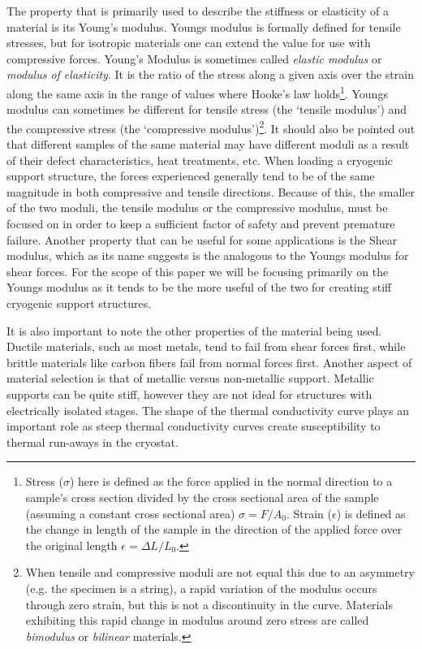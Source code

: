 \documentclass[final]{svjour2}
\begin{document}
The property that is primarily used to describe the stiffness or elasticity of a material is its Young's modulus. Youngs modulus is formally defined for tensile stresses, but for isotropic materials one can extend the value for use with compressive forces. Young's Modulus is sometimes called {\em elastic modulus} or {\em modulus of elasticity}. It is the ratio of the stress along a given axis over the strain along the same axis in the range of values where Hooke's law holds\footnote{Stress ($\sigma$) here is defined as the force applied in the normal direction to a sample's cross section divided by the cross sectional area of the sample (assuming a constant cross sectional area) $\sigma = F/A_{0}$.  Strain ($\epsilon$) is defined as the change in length of the sample in the direction of the applied force over the original length $\epsilon=\Delta L/L_{0}$.}.  Youngs modulus can sometimes be different for tensile stress (the `tensile modulus') and the compressive stress (the `compressive modulus')\footnote{When tensile and compressive moduli are not equal this due to an asymmetry (e.g. the specimen is a string), a rapid variation of the modulus occurs through zero strain, but this is not a discontinuity in the curve. Materials exhibiting this rapid change in modulus around zero stress are called {\em bimodulus} or {\em bilinear} materials.}. It should also be pointed out that different samples of the same material may have different moduli as a result of their defect characteristics, heat treatments, etc. When loading a cryogenic support structure, the forces experienced generally tend to be of the same magnitude in both compressive and tensile directions.  Because of this, the smaller of the two moduli, the tensile modulus or the compressive modulus, must be focused on in order to keep a sufficient factor of safety and prevent premature failure. Another property that can be useful for some applications is the Shear modulus, which as its name suggests is the analogous to the Youngs modulus for shear forces.  For the scope of this paper we will be focusing primarily on the Youngs modulus as it tends to be the more useful of the two for creating stiff cryogenic support structures. 

It is also important to note the other properties of the material being used.  Ductile materials, such as most metals, tend to fail from shear forces first, while brittle materials like carbon fibers fail from normal forces first.  Another aspect of material selection is that of metallic versus non-metallic support. Metallic supports can be quite stiff, however they are not ideal for structures with electrically isolated stages.  The shape of the thermal conductivity curve plays an important role as steep thermal conductivity curves create susceptibility to thermal run-aways in the cryostat.
\end{document}
